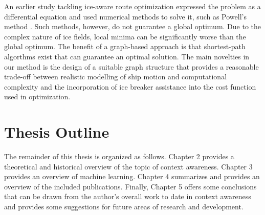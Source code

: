 An earlier study tackling ice-aware route optimization expressed the problem as a differential equation and used numerical methods to solve it, such as Powell's method \cite{kotovirta2009system}. Such methods, however, do not guarantee a global optimum. Due to the complex nature of ice fields, local minima can be significantly worse than the global optimum. The benefit of a graph-based approach is that shortest-path algorthms exist that can guarantee an optimal solution. The main novelties in our method is the design of a suitable graph structure that provides a reasonable trade-off between realistic modelling of ship motion and computational complexity and the incorporation of ice breaker assistance into the cost function used in optimization.  

\section{Thesis Outline}
\label{sec:outline}
 
The remainder of this thesis is organized as follows. Chapter 2 provides a theoretical and historical overview of the topic of context awareness. Chapter 3 provides an overview of machine learning. Chapter 4 summarizes and provides an overview of the included publications. Finally, Chapter 5 offers some conclusions that can be drawn from the author's overall work to date in context awareness and provides some suggestions for future areas of research and development.